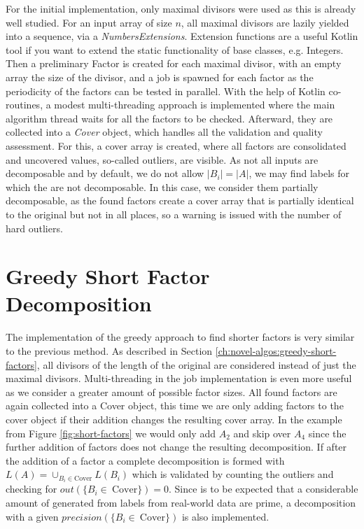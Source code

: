 For the initial implementation, only maximal divisors were used as this is already well studied.
For an input array of size $n$, all maximal divisors are lazily yielded into a sequence, via a \textit{NumbersExtensions}.
Extension functions are a useful Kotlin tool if you want to extend the static functionality of base classes, e.g. Integers.
Then a preliminary Factor is created for each maximal divisor, with an empty array the size of the divisor, and a job is spawned for each factor as the periodicity of the factors can be tested in parallel.
With the help of Kotlin co-routines, a modest multi-threading approach is implemented where the main algorithm thread waits for all the factors to be checked. Afterward, they are collected into a \textit{Cover} object, which handles all the validation and quality assessment.
For this, a cover array is created, where all factors are consolidated and uncovered values, so-called outliers, are visible.
As not all inputs are decomposable and by default, we do not allow  $|B_i| = |A|$, we may find labels for which the \DFAs are not decomposable. In this case, we consider them partially decomposable, as the found factors create a cover array that is partially identical to the original but not in all places, so a warning is issued with the number of hard outliers.

\section{Greedy Short Factor Decomposition}
\label{ch:Implementation:greedy-short-factor}
The implementation of the greedy approach to find shorter factors is very similar to the previous method.
As described in Section \ref{ch:novel-algos:greedy-short-factors}, all divisors of the length of the original \DFA are considered instead of just the maximal divisors.
Multi-threading in the job implementation is even more useful as we consider a greater amount of possible factor sizes.
All found factors are again collected into a Cover object, this time we are only adding factors to the cover object if their addition changes the resulting cover array.
In the example from Figure \ref{fig:short-factors} we would only add $A_2$ and skip over $A_4$ since the further addition of factors does not change the resulting decomposition.
If after the addition of a factor a complete decomposition is formed with $L(A) = \cup_{B_i \in \text{Cover}} L(B_i)$ which is validated by counting the outliers and checking for $out(\{B_i \in~\text{Cover}\}) = 0$.
Since is to be expected that a considerable amount of \DFAs generated from labels from real-world data are prime, a decomposition with a given $precision(\{B_i \in~\text{Cover}\})$ is also implemented.

